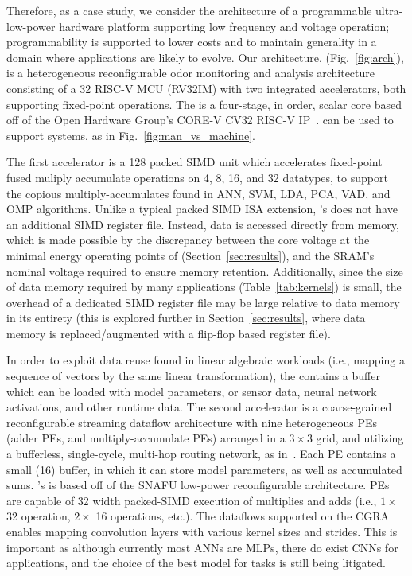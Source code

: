 Therefore, as a case study, we consider the architecture of a programmable
ultra-low-power \olfc{} hardware platform supporting low frequency
and voltage operation; programmability is supported to lower costs and to
maintain generality in a domain where applications are likely to evolve.  Our
architecture, \arch{} (Fig.~\ref{fig:arch}), is a heterogeneous reconfigurable
odor monitoring and analysis architecture consisting of a \SI{32}{\bit} RISC-V
MCU (RV32IM) with two integrated accelerators, both supporting fixed-point
operations. The \mcu{} is a four-stage, in order, scalar core based off of the
Open Hardware Group's CORE-V CV32 RISC-V IP~\cite{CV32_RISCV_IP}.  \arch{}
can be used to support \olfc{} systems, as in Fig.~\ref{fig:man_vs_machine}.

The first accelerator is a \SI{128}{\bit} packed SIMD unit which accelerates
fixed-point fused muliply accumulate operations on 4, 8, 16, and \SI{32}{\bit}
datatypes, to support the copious multiply-accumulates found in ANN, SVM,
LDA, PCA, VAD, and OMP algorithms.
Unlike a typical packed SIMD ISA extension, \arch{}'s \vmacc{} does not have an
additional SIMD register file.  Instead, data is accessed directly from memory,
which is made possible by the discrepancy between the core voltage at the
minimal energy operating points of \arch{} (Section~\ref{sec:results}), and the
SRAM's nominal voltage required to ensure memory retention. Additionally,
since the size of data memory required by many applications (Table~\ref{tab:kernels})
is small, the overhead of a dedicated SIMD register file may be large relative
to data memory in its entirety
(this is explored further in Section~\ref{sec:results}, where data memory is
replaced/augmented with a flip-flop based register file).

In order to exploit
data reuse found in linear algebraic workloads (i.e., mapping a sequence of
vectors by the same linear transformation), the \vmacc{} contains a buffer
which can be loaded with model parameters, or sensor data, neural network
activations, and other runtime data. The second accelerator is a coarse-grained
reconfigurable streaming dataflow architecture with nine heterogeneous PEs
(adder PEs, and multiply-accumulate PEs) arranged in a \(3\times 3\) grid, and
utilizing a bufferless, single-cycle, multi-hop routing network, as
in~\cite{wang2019hycube, gobieski2021snafu}. Each PE contains a small
(\SI{16}{\byte}) buffer, in which it can store model parameters, as well as
accumulated sums.  \arch{}'s \cgra{} is based off of the SNAFU low-power
reconfigurable architecture. PEs are capable of \SI{32}{\bit} width packed-SIMD
execution of multiplies and adds (i.e., $1\times$ \SI{32}{\bit} operation,
$2\times$ \SI{16}{\bit} operations, etc.).  The dataflows supported  on
the CGRA enables mapping convolution layers with various kernel sizes and strides.
This is important as although currently most \olfc{} ANNs are MLPs,
there do exist CNNs for \olfc{} applications, and the choice of the best
model for \olfc{} tasks is still being litigated.

